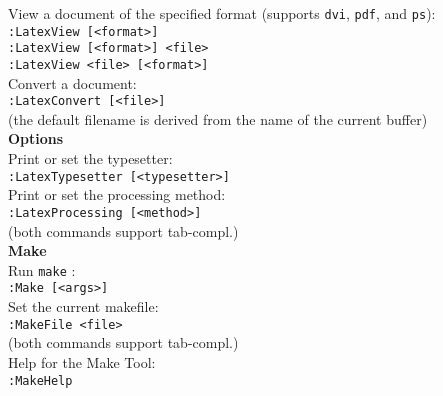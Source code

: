 \documentclass[oneside,10pt,landscape,DIV16]{scrartcl}
\begin{document}
\begin{multicols}{3}
\begin{center}
{View a document of the specified format
(supports \texttt{dvi}, \texttt{pdf}, and \texttt{ps}): \\[1.0ex]
\texttt{:LatexView [<format>]} \\[1.0ex]
\texttt{:LatexView [<format>] <file>} \\[1.0ex]
\texttt{:LatexView <file> [<format>]} \\[1.0ex]
Convert a document: \\[1.0ex]
\texttt{:LatexConvert [<file>]} \\[1.0ex]
(the default filename is derived from the name of the current buffer) \\[2.5ex]
%
\large{\textbf{Options}}\\[1.0ex]
Print or set the typesetter: \\[1.0ex]
\texttt{:LatexTypesetter [<typesetter>]} \\[1.0ex]
Print or set the processing method: \\[1.0ex]
\texttt{:LatexProcessing [<method>]} \\[1.0ex]
(both commands support tab-compl.) \\[2.5ex]
%
\large{\textbf{Make}}\\[1.0ex]
Run \texttt{make} : \\[1.0ex]
\texttt{:Make [<args>]} \\[1.0ex]
Set the current makefile: \\[1.0ex]
\texttt{:MakeFile <file>} \\[1.0ex]
(both commands support tab-compl.) \\[1.0ex]
Help for the Make Tool: \\[1.0ex]
\texttt{:MakeHelp} \\[2.5ex]
}
%
\end{center}%
\end{multicols}%
%
\end{document}
